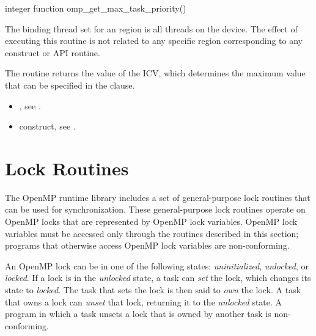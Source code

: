 \fortranspecificstart
\begin{boxedcode}
integer function omp\_get\_max\_task\_priority()
\end{boxedcode}
\fortranspecificend

\binding

The binding thread set for an  region is all threads
on the device. The effect of executing this routine is not related to any specific region
corresponding to any construct or API routine.

\effect

The  routine returns the value of the 
ICV, which determines the maximum value that can be specified in the  clause.

\crossreferences

\begin{itemize}
\item {}, see 
.

\item {} construct, see 
. 
\end{itemize}










\section{Lock Routines}
\label{sec:Lock Routines}

\vspace{-8pt}

The OpenMP runtime library includes a set of general-purpose lock routines that can be 
used for synchronization. These general-purpose lock routines operate on OpenMP locks 
that are represented by OpenMP lock variables. OpenMP lock variables must be 
accessed only through the routines described in this section; programs that otherwise 
access OpenMP lock variables are non-conforming.

An OpenMP lock can be in one of the following states: \emph{uninitialized}, \emph{unlocked}, or 
\emph{locked}. If a lock is in the \emph{unlocked} state, a task can \emph{set} the lock, which changes its state 
to \emph{locked}. The task that sets the lock is then said to \emph{own} the lock. A task that owns a 
lock can \emph{unset} that lock, returning it to the \emph{unlocked} state. A program in which a task 
unsets a lock that is owned by another task is non-conforming.

